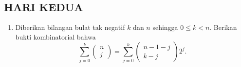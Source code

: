 \documentclass[12pt,twoside]{article}
\begin{document}
\subsection{HARI KEDUA}
\begin{enumerate}
  \item Diberikan bilangan bulat tak negatif $k$ dan $n$ sehingga $0 \leq k <n$. Berikan bukti kombinatorial bahwa
        \begin{equation*}
          \displaystyle\sum_{j=0}^{k} \begin{pmatrix}
            n \\j
          \end{pmatrix} = \sum_{j=0}^{k}\begin{pmatrix}
            n-1-j \\k-j
          \end{pmatrix}2^j.
        \end{equation*}


\end{enumerate}
\end{document}
